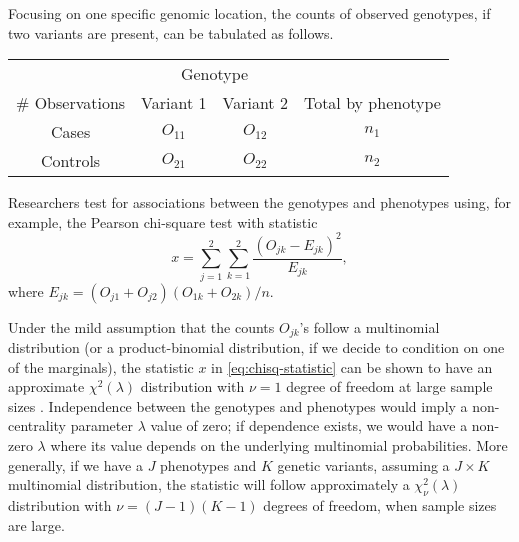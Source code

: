 Focusing on one specific genomic location, the counts of observed genotypes, if two variants are present, can be tabulated as follows.
\begin{center}
    \begin{tabular}{cccc}
    \hline
    & \multicolumn{2}{c}{Genotype} & \\
    \cline{2-3}
    \# Observations & Variant 1 & Variant 2 & Total by phenotype \\
    \hline
    Cases & $O_{11}$ & $O_{12}$ & $n_1$ \\
    Controls & $O_{21}$ & $O_{22}$ & $n_2$ \\
    \hline
    \end{tabular}
\end{center}
Researchers test for associations between the genotypes and phenotypes using, for example, the Pearson chi-square test with statistic
\begin{equation} \label{eq:chisq-statistic}
    x = \sum_{j=1}^2 \sum_{k=1}^2 \frac{(O_{jk} - E_{jk})^2}{E_{jk}},
\end{equation}
where ${E}_{jk} = (O_{j1}+O_{j2})(O_{1k}+O_{2k})/n$.

Under the mild assumption that the counts $O_{jk}$'s follow a multinomial distribution (or a product-binomial distribution, if we decide to condition on one of the marginals), the statistic $x$ in \eqref{eq:chisq-statistic} can be shown to have an approximate $\chi^2(\lambda)$ distribution with $\nu=1$ degree of freedom at large sample sizes \citep{agresti2018introduction}. 
Independence between the genotypes and phenotypes would imply a non-centrality parameter $\lambda$ value of zero; if dependence exists, we would have a non-zero $\lambda$ where its value depends on the underlying multinomial probabilities.
More generally, if we have a $J$ phenotypes and $K$ genetic variants, assuming a $J\times K$ multinomial distribution, the statistic will follow approximately a $\chi^2_{\nu}(\lambda)$ distribution with $\nu = (J-1)(K-1)$ degrees of freedom, when sample sizes are large.

